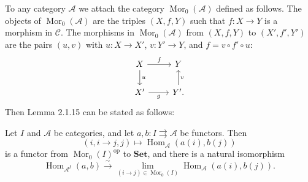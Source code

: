 \documentclass[12pt]{article}
\theoremstyle{remark}
\theoremstyle{definition}
\newcommand{\A}{\mathcal A}
\newcommand{\C}{\mathcal C}
\newcommand{\Set}{\mathbf{Set}}
\newcommand{\parar}{\rightrightarrows}
\newcommand{\xr}{\xrightarrow}
\DeclareMathOperator{\Hom}{Hom}%
\DeclareMathOperator{\Mor}{Mor}
\DeclareMathOperator{\op}{op}
\begin{document}
To any category $\A$ we attach the category $\Mor_0(\A)$ defined as follows. The objects of $\Mor_0(\A)$ are the triples $(X,f,Y)$ such that $f:X\to Y$ is a morphism in $\C$. The morphisms in $\Mor_0(\A)$ from $(X,f,Y)$ to $(X',f',Y')$ are the pairs $(u,v)$ with $u:X\to X'$, $v:Y'\to Y$, and $f=v\circ f'\circ u$:
$$
\begin{tikzcd}
X\ar{d}{u}\ar{r}{f}&Y\\ 
X'\ar{r}[swap]{g}&Y'\ar{u}[swap]{v}.
\end{tikzcd}
$$ 
Then Lemma 2.1.15 can be stated as follows: 

Let $I$ and $\A$ be categories, and let $a,b:I\parar\A$ be functors. Then 
$$
(i,i\to j,j)\mapsto\Hom_\A(a(i),b(j))
$$ 
is a functor from $\Mor_0(I)^{\op}$ to $\Set$, and there is a natural isomorphism 
%
\begin{equation}\label{2115} 
\Hom_{\A^I}(a,b)\xr\sim\lim_{(i\to j)\in\Mor_0(I)}\Hom_\A(a(i),b(j)).
\end{equation}
%
\end{document}
